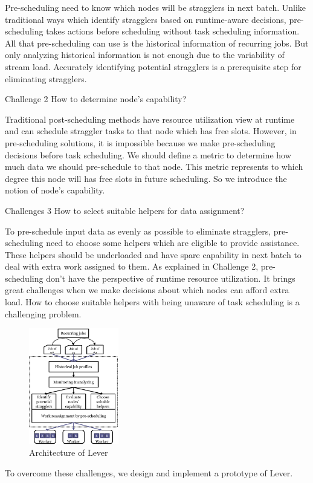 \documentclass[10pt,conference,compsocconf,letterpaper]{IEEEtran}
\begin{document}
  Pre-scheduling need to know which nodes will be stragglers in next batch. Unlike traditional ways which identify stragglers based on runtime-aware decisions, pre-scheduling takes actions before scheduling without task scheduling information. All that pre-scheduling can use is the historical information of recurring jobs. But only analyzing historical information is not enough due to the variability of stream load. Accurately identifying potential stragglers is a prerequisite step for eliminating stragglers.

  Challenge 2 How to determine node's capability?

  Traditional post-scheduling methods have resource utilization view at runtime and can schedule straggler tasks to that node which has free slots. However, in pre-scheduling solutions, it is impossible because we make pre-scheduling decisions before task scheduling. We should define a metric to determine how much data we should pre-schedule to that node. This metric represents to which degree this node will has free slots in future scheduling. So we introduce the notion of node's capability.

  Challenges 3 How to select suitable helpers for data assignment?

  To pre-schedule input data as evenly as possible to eliminate stragglers, pre-scheduling need to choose some helpers which are eligible to provide assistance. These helpers should be underloaded and have spare capability in next batch to deal with extra work assigned to them. As explained in Challenge 2, pre-scheduling don't have the perspective of runtime resource utilization. It brings great challenges when we make decisions about which nodes can afford extra load. How to choose suitable helpers with being unaware of task scheduling is a challenging problem.

  \begin{figure}[htbp]
    \centering
    \includegraphics[width=0.35\textwidth]{FigureArchitecture}
    \caption{Architecture of Lever}
    \label{Fig. 5:}
  \end{figure}
  To overcome these challenges, we design and implement a prototype of Lever.
\end{document}
